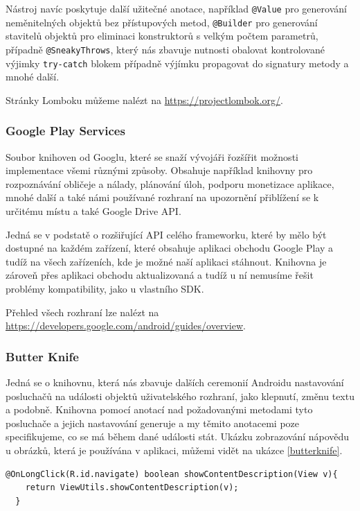 \documentclass{article}
\begin{document}
Nástroj navíc poskytuje další užitečné anotace, například \texttt{@Value} pro generování neměnitelných objektů
bez přístupových metod, \texttt{@Builder} pro generování stavitelů objektů pro eliminaci konstruktorů s velkým
počtem parametrů, případně \texttt{@SneakyThrows}, který nás zbavuje nutnosti obalovat kontrolované výjimky
\texttt{try-catch} blokem případně výjímku propagovat do signatury metody a mnohé další.

Stránky Lomboku můžeme nalézt na \url{https://projectlombok.org/}.

\subsubsection{Google Play Services}
Soubor knihoven od Googlu, které se snaží vývojáři řozšířit možnosti implementace všemi různými způsoby.
Obsahuje například knihovny pro rozpoznávání obličeje a nálady, plánování úloh, podporu monetizace aplikace,
mnohé další a také námi používané rozhraní na upozornění přiblížení se k určitému místu a také Google Drive API.

Jedná se v podstatě o rozšiřující API celého frameworku, které by mělo být dostupné na každém zařízení, které
obsahuje aplikaci obchodu Google Play a tudíž na všech zařízeních, kde je možné naší aplikaci stáhnout.
Knihovna je zároveň přes aplikaci obchodu aktualizovaná a tudíž u ní nemusíme řešit problémy
kompatibility, jako u vlastního SDK. \cite{gms}

Přehled všech rozhraní lze nalézt na \url{https://developers.google.com/android/guides/overview}.

\subsubsection{Butter Knife}
Jedná se o knihovnu, která nás zbavuje dalších ceremonií Androidu nastavování posluchačů
na události objektů uživatelského rozhraní, jako klepnutí, změnu textu a podobně. Knihovna pomocí
anotací nad požadovanými metodami tyto posluchače a jejich nastavování generuje a my těmito anotacemi
poze specifikujeme, co se má během dané události stát. Ukázku zobrazování nápovědu u obrázků, která je
používána v aplikaci, můžemi vidět na ukázce \ref{butterknife}.

\begin{lstlisting}[label=butterknife,caption=Použití knihovny Butter Knife]
  @OnLongClick(R.id.navigate) boolean showContentDescription(View v){
    return ViewUtils.showContentDescription(v);
  }

\end{lstlisting}
\end{document}
